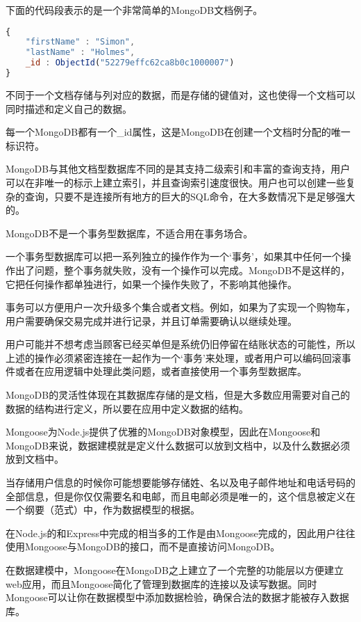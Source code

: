 下面的代码段表示的是一个非常简单的MongoDB文档例子。

\begin{lstlisting}[language=JavaScript]
{
    "firstName" : "Simon",    
    "lastName" : "Holmes", 
    _id : ObjectId("52279effc62ca8b0c1000007")    
}
\end{lstlisting}

不同于一个文档存储与列对应的数据，而是存储的键值对，这也使得一个文档可以同时描述和定义自己的数据。

每一个MongoDB都有一个\_id属性，这是MongoDB在创建一个文档时分配的唯一标识符。

MongoDB与其他文档型数据库不同的是其支持二级索引和丰富的查询支持，用户可以在非唯一的标示上建立索引，并且查询索引速度很快。用户也可以创建一些复杂的查询，只要不是连接所有地方的巨大的SQL命令，在大多数情况下是足够强大的。

MongoDB不是一个事务型数据库，不适合用在事务场合。

一个事务型数据库可以把一系列独立的操作作为一个‘事务’，如果其中任何一个操作出了问题，整个事务就失败，没有一个操作可以完成。MongoDB不是这样的，它把任何操作都单独进行，如果一个操作失败了，不影响其他操作。

事务可以方便用户一次升级多个集合或者文档。例如，如果为了实现一个购物车，用户需要确保交易完成并进行记录，并且订单需要确认以继续处理。

用户可能并不想考虑当顾客已经买单但是系统仍旧停留在结账状态的可能性，所以上述的操作必须紧密连接在一起作为一个‘事务’来处理，或者用户可以编码回滚事件或者在应用逻辑中处理此类问题，或者直接使用一个事务型数据库。

MongoDB的灵活性体现在其数据库存储的是文档，但是大多数应用需要对自己的数据的结构进行定义，所以要在应用中定义数据的结构。

Mongoose为Node.js提供了优雅的MongoDB对象模型，因此在Mongoose和MongoDB来说，数据建模就是定义什么数据可以放到文档中，以及什么数据必须放到文档中。



当存储用户信息的时候你可能想要能够存储姓、名以及电子邮件地址和电话号码的全部信息，但是你仅仅需要名和电邮，而且电邮必须是唯一的，这个信息被定义在一个纲要（范式）中，作为数据模型的根据。


在Node.js的和Express中完成的相当多的工作是由Mongoose完成的，因此用户往往使用Mongoose与MongoDB的接口，而不是直接访问MongoDB。

在数据建模中，Mongoose在MongoDB之上建立了一个完整的功能层以方便建立web应用，而且Mongoose简化了管理到数据库的连接以及读写数据。同时Mongoose可以让你在数据模型中添加数据检验，确保合法的数据才能被存入数据库。

